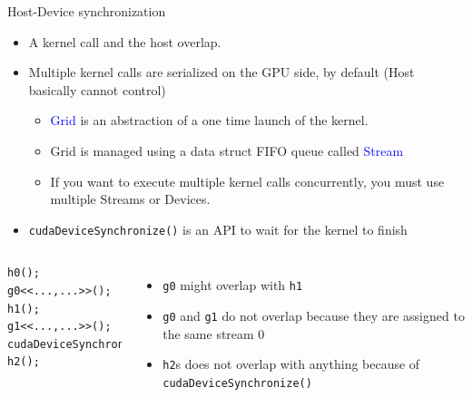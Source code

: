 \documentclass[dvipdfmx, 11pt, aspectratio=169]{beamer}   %
\begin{document}
\begin{frame}[fragile]{Host-Device synchronization}
  \begin{itemize}
    \item A kernel call and the host overlap.
    \item Multiple kernel calls are serialized on the GPU side, by default (Host basically cannot control)
    \begin{itemize}
      \item \textcolor{blue}{Grid} is an abstraction of a one time launch of the kernel.
      \item Grid is managed using a data struct FIFO queue called \textcolor{blue}{Stream}
      \item If you want to execute multiple kernel calls concurrently, you must use multiple Streams or Devices.
    \end{itemize}
    \item \lstinline|cudaDeviceSynchronize()| is an API to wait for the kernel to finish
  \end{itemize}
  \begin{columns}
    \begin{lstlisting}
h0();
g0<<...,...>>();
h1();
g1<<...,...>>();
cudaDeviceSynchronize();
h2();
\end{lstlisting}
    \begin{itemize}
      \item \lstinline|g0| might overlap with \lstinline|h1|
      \item \lstinline|g0| and \lstinline|g1| do not overlap because they are assigned to the same stream 0
      \item \lstinline|h2|s does not overlap with anything because of \lstinline|cudaDeviceSynchronize()|
    \end{itemize}
  \end{columns}
\end{frame}
\end{document}
